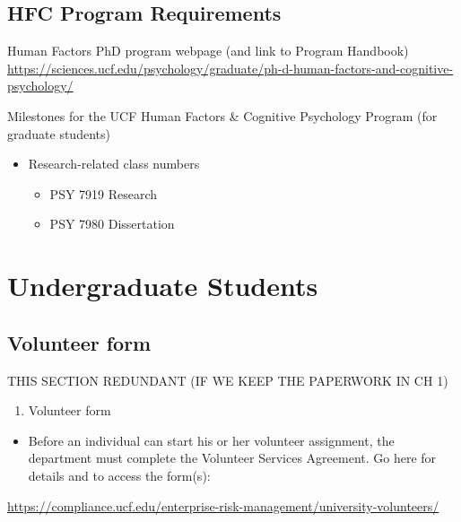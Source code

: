 \documentclass[
]{book}
\providecommand{\tightlist}{%
  \setlength{\itemsep}{0pt}\setlength{\parskip}{0pt}}
\begin{document}
\hypertarget{hfc-program-requirements}{%
\subsection{HFC Program Requirements}\label{hfc-program-requirements}}

Human Factors PhD program webpage (and link to Program Handbook)
\url{https://sciences.ucf.edu/psychology/graduate/ph-d-human-factors-and-cognitive-psychology/}

Milestones for the UCF Human Factors \& Cognitive Psychology Program (for graduate students)

\begin{itemize}
\tightlist
\item
  Research-related class numbers

  \begin{itemize}
  \tightlist
  \item
    PSY 7919 Research
  \item
    PSY 7980 Dissertation
  \end{itemize}
\end{itemize}

\hypertarget{undergraduate-students-1}{%
\section{Undergraduate Students}\label{undergraduate-students-1}}

\hypertarget{volunteer-form}{%
\subsection{Volunteer form}\label{volunteer-form}}

THIS SECTION REDUNDANT (IF WE KEEP THE PAPERWORK IN CH 1)

\begin{enumerate}
\def\labelenumi{\arabic{enumi}.}
\tightlist
\item
  Volunteer form
\end{enumerate}

\begin{itemize}
\tightlist
\item
  Before an individual can start his or her volunteer assignment, the department must complete the Volunteer Services Agreement. Go here for details and to access the form(s):
\end{itemize}

\url{https://compliance.ucf.edu/enterprise-risk-management/university-volunteers/}
\end{document}
